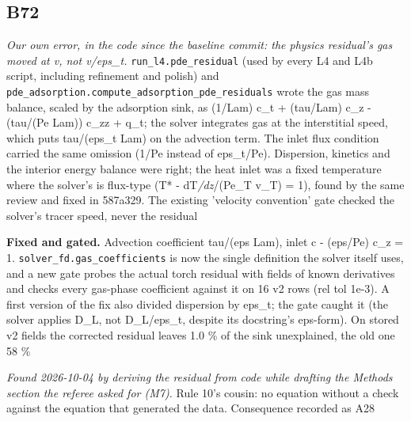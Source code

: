 \documentclass[10pt]{article}
\begin{document}
\subsection*{B72}\label{led:B72}
\begin{description}[leftmargin=0pt,itemsep=1pt]
\item[Defect.] \emph{Our own error, in the code since the baseline commit: the physics residual's gas moved at v, not v/eps\_t.} \texttt{run\_l4.pde\_residual} (used by every L4 and L4b script, including refinement and polish) and \texttt{pde\_adsorption.compute\_adsorption\_pde\_residuals} wrote the gas mass balance, scaled by the adsorption sink, as (1/Lam) c\_t + (tau/Lam) c\_z - (tau/(Pe Lam)) c\_zz + q\_t; the solver integrates gas at the interstitial speed, which puts tau/(eps\_t Lam) on the advection term. The inlet flux condition carried the same omission (1/Pe instead of eps\_t/Pe). Dispersion, kinetics and the interior energy balance were right; the heat inlet was a fixed temperature where the solver's is flux-type (T* - dT\emph{/dz}/(Pe\_T v\_T) = 1), found by the same review and fixed in 587a329. The existing 'velocity convention' gate checked the solver's tracer speed, never the residual
\item[Resolution.] \textbf{Fixed and gated.} Advection coefficient tau/(eps Lam), inlet c - (eps/Pe) c\_z = 1. \texttt{solver\_fd.gas\_coefficients} is now the single definition the solver itself uses, and a new gate probes the actual torch residual with fields of known derivatives and checks every gas-phase coefficient against it on 16 v2 rows (rel tol 1e-3). A first version of the fix also divided dispersion by eps\_t; the gate caught it (the solver applies D\_L, not D\_L/eps\_t, despite its docstring's eps-form). On stored v2 fields the corrected residual leaves 1.0 \% of the sink unexplained, the old one 58 \%
\item[Note.] \emph{Found 2026-10-04 by deriving the residual from code while drafting the Methods section the referee asked for (M7).} Rule 10's cousin: no equation without a check against the equation that generated the data. Consequence recorded as A28
\end{description}
\end{document}
